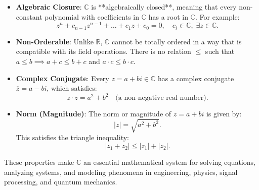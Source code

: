 \begin{itemize}
    \item \textbf{Algebraic Closure}: \( \mathbb{C} \) is **algebraically closed**, meaning that every non-constant polynomial with coefficients in \( \mathbb{C} \) has a root in \( \mathbb{C} \). For example:
    \[
    z^n + c_{n-1}z^{n-1} + \dots + c_1z + c_0 = 0, \quad c_i \in \mathbb{C}, \; \exists z \in \mathbb{C}.
    \]

    \item \textbf{Non-Orderable}: Unlike \( \mathbb{R} \), \( \mathbb{C} \) cannot be totally ordered in a way that is compatible with its field operations. There is no relation \( \leq \) such that \( a \leq b \implies a + c \leq b + c \) and \( a \cdot c \leq b \cdot c \).

\vspace{\baselineskip}\par
    \item \textbf{Complex Conjugate}: Every \( z = a + bi \in \mathbb{C} \) has a complex conjugate \( \overline{z} = a - bi \), which satisfies:
    \[
    z \cdot \overline{z} = a^2 + b^2 \quad \text{(a non-negative real number)}.
    \]

    \item \textbf{Norm (Magnitude)}: The norm or magnitude of \( z = a + bi \) is given by:
    \[
    |z| = \sqrt{a^2 + b^2}.
    \]
    This satisfies the triangle inequality:
    \[
    |z_1 + z_2| \leq |z_1| + |z_2|.
    \]
\end{itemize}


These properties make \( \mathbb{C} \) an essential mathematical system for solving equations, analyzing systems, and modeling phenomena in engineering, physics, signal processing, and quantum mechanics.

